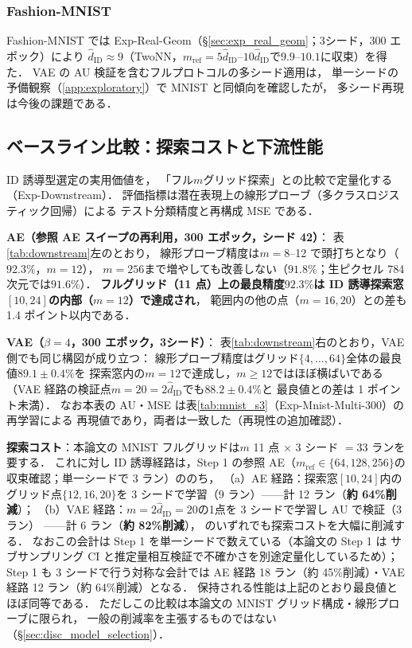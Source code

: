 \documentclass[11pt,a4paper]{jsarticle}
\newcommand{\hatdID}{\hat{d}_{\mathrm{ID}}}
\begin{document}
\subsubsection{Fashion-MNIST}

Fashion-MNIST では Exp-Real-Geom（§\ref{sec:exp_real_geom}；3シード，300 エポック）により
$\hatdID \approx 9$（TwoNN，$m_{\mathrm{ref}} = 5\hatdID$--$10\hatdID$で$9.9$--$10.1$に収束）を得た．
VAE の AU 検証を含むフルプロトコルの多シード適用は，
単一シードの予備観察（\ref{app:exploratory}）で MNIST と同傾向を確認したが，
多シード再現は今後の課題である．

\subsection{ベースライン比較：探索コストと下流性能}\label{sec:exp_downstream}

ID 誘導型選定の実用価値を，
「フル$m$グリッド探索」との比較で定量化する（Exp-Downstream）．
評価指標は潜在表現上の線形プローブ（多クラスロジスティック回帰）による
テスト分類精度と再構成 MSE である．

\textbf{AE（参照 AE スイープの再利用，300 エポック，シード 42）}：
表\ref{tab:downstream}左のとおり，
線形プローブ精度は$m = 8$--12 で頭打ちとなり（$92.3\%$，$m = 12$），
$m = 256$まで増やしても改善しない（$91.8\%$；生ピクセル 784 次元では$91.6\%$）．
\textbf{フルグリッド（11 点）上の最良精度$92.3\%$は
ID 誘導探索窓$[10, 24]$の内部（$m = 12$）で達成され}，
範囲内の他の点（$m = 16, 20$）との差も 1.4 ポイント以内である．

\textbf{VAE（$\beta = 4$，300 エポック，3シード）}：
表\ref{tab:downstream}右のとおり，VAE 側でも同じ構図が成り立つ：
線形プローブ精度はグリッド$\{4, \ldots, 64\}$全体の最良値$89.1 \pm 0.4\%$を
探索窓内の$m = 12$で達成し，$m \geq 12$ではほぼ横ばいである
（VAE 経路の検証点$m = 20 = 2\hatdID$でも$88.2 \pm 0.4\%$と
最良値との差は 1 ポイント未満）．
なお本表の AU・MSE は表\ref{tab:mnist_s3}（Exp-Mnist-Multi-300）の再学習による
再現値であり，両者は一致した（再現性の追加確認）．

\textbf{探索コスト}：本論文の MNIST フルグリッドは$m$ 11 点
$\times$ 3 シード $= 33$ ランを要する．
これに対し ID 誘導経路は，Step 1 の参照 AE（$m_{\mathrm{ref}} \in \{64, 128, 256\}$の
収束確認；単一シードで 3 ラン）ののち，
（a）AE 経路：探索窓$[10, 24]$内のグリッド点$\{12, 16, 20\}$を
3 シードで学習（9 ラン）——計 12 ラン（\textbf{約 64\%削減}）；
（b）VAE 経路：$m = 2\hatdID = 20$の1点を 3 シードで学習し AU で検証（3 ラン）
——計 6 ラン（\textbf{約 82\%削減}），
のいずれでも探索コストを大幅に削減する．
なおこの会計は Step 1 を単一シードで数えている（本論文の Step 1 は
サブサンプリング CI と推定量相互検証で不確かさを別途定量化しているため）；
Step 1 も 3 シードで行う対称な会計では
AE 経路 18 ラン（約 45\%削減）・VAE 経路 12 ラン（約 64\%削減）となる．
保持される性能は上記のとおり最良値とほぼ同等である．
ただしこの比較は本論文の MNIST グリッド構成・線形プローブに限られ，
一般の削減率を主張するものではない（§\ref{sec:disc_model_selection}）．
\end{document}
